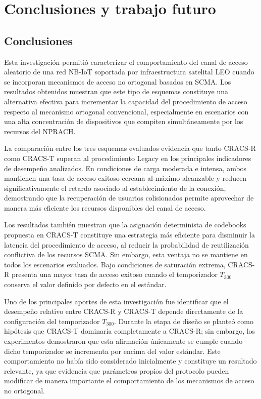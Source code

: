\chapter{Conclusiones y trabajo futuro}
\label{ch:conclusiones}

\section{Conclusiones}

Esta investigación permitió caracterizar el comportamiento del canal de acceso aleatorio de una red NB-IoT soportada por infraestructura satelital LEO cuando se incorporan mecanismos de acceso no ortogonal basados en SCMA. Los resultados obtenidos muestran que este tipo de esquemas constituye una alternativa efectiva para incrementar la capacidad del procedimiento de acceso respecto al mecanismo ortogonal convencional, especialmente en escenarios con una alta concentración de dispositivos que compiten simultáneamente por los recursos del NPRACH.

La comparación entre los tres esquemas evaluados evidencia que tanto CRACS-R como CRACS-T superan al procedimiento Legacy en los principales indicadores de desempeño analizados. En condiciones de carga moderada e intensa, ambos mantienen una tasa de acceso exitoso cercana al máximo alcanzable y reducen significativamente el retardo asociado al establecimiento de la conexión, demostrando que la recuperación de usuarios colisionados permite aprovechar de manera más eficiente los recursos disponibles del canal de acceso.

Los resultados también muestran que la asignación determinista de codebooks propuesta en CRACS-T constituye una estrategia más eficiente para disminuir la latencia del procedimiento de acceso, al reducir la probabilidad de reutilización conflictiva de los recursos SCMA. Sin embargo, esta ventaja no se mantiene en todos los escenarios evaluados. Bajo condiciones de saturación extrema, CRACS-R presenta una mayor tasa de acceso exitoso cuando el temporizador $T_{300}$ conserva el valor definido por defecto en el estándar.

Uno de los principales aportes de esta investigación fue identificar que el desempeño relativo entre CRACS-R y CRACS-T depende directamente de la configuración del temporizador $T_{300}$. Durante la etapa de diseño se planteó como hipótesis que CRACS-T dominaría completamente a CRACS-R; sin embargo, los experimentos demostraron que esta afirmación únicamente se cumple cuando dicho temporizador se incrementa por encima del valor estándar. Este comportamiento no había sido considerado inicialmente y constituye un resultado relevante, ya que evidencia que parámetros propios del protocolo pueden modificar de manera importante el comportamiento de los mecanismos de acceso no ortogonal.

